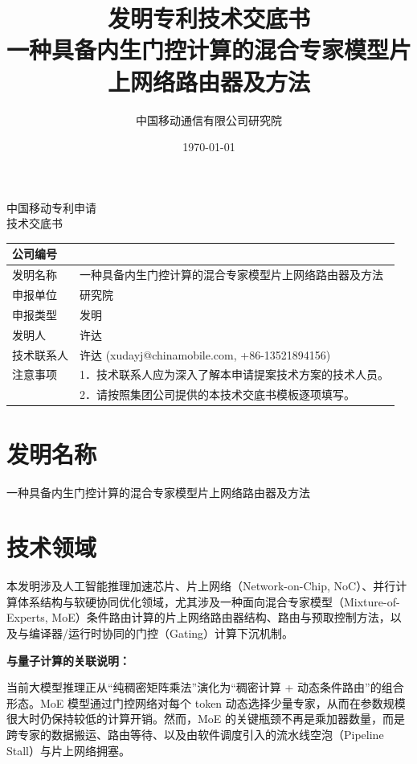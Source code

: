 \documentclass[12pt,a4paper]{article}
\title{\textbf{发明专利技术交底书} \\[0.5em]
\Large 一种具备内生门控计算的混合专家模型片上网络路由器及方法}
\author{中国移动通信有限公司研究院}
\date{\today}
\begin{document}
\begin{center}
    {\Large\heiti 中国移动专利申请} \\[1em]
    {\Huge\heiti 技术交底书} \\[1em]
\end{center}

\noindent
\begin{tabular}{|p{3cm}|p{12cm}|}
\hline
公司编号 &  \\
\hline
发明名称 & 一种具备内生门控计算的混合专家模型片上网络路由器及方法 \\
\hline
申报单位 & 研究院 \\
\hline
申报类型 & 发明 \\
\hline
发明人 & 许达 \\
\hline
技术联系人 & 许达 (xudayj@chinamobile.com, +86-13521894156) \\
\hline
注意事项 & 1．技术联系人应为深入了解本申请提案技术方案的技术人员。 \\
         & 2．请按照集团公司提供的本技术交底书模板逐项填写。 \\
\hline
\end{tabular}

\vspace{1cm}

\section{发明名称}

一种具备内生门控计算的混合专家模型片上网络路由器及方法

\section{技术领域}

本发明涉及人工智能推理加速芯片、片上网络（Network-on-Chip, NoC）、并行计算体系结构与软硬协同优化领域，尤其涉及一种面向混合专家模型（Mixture-of-Experts, MoE）条件路由计算的片上网络路由器结构、路由与预取控制方法，以及与编译器/运行时协同的门控（Gating）计算下沉机制。

\textbf{与量子计算的关联说明：}

当前大模型推理正从“纯稠密矩阵乘法”演化为“稠密计算 + 动态条件路由”的组合形态。MoE 模型通过门控网络对每个 token 动态选择少量专家，从而在参数规模很大时仍保持较低的计算开销。然而，MoE 的关键瓶颈不再是乘加器数量，而是跨专家的数据搬运、路由等待、以及由软件调度引入的流水线空泡（Pipeline Stall）与片上网络拥塞。
\end{document}
